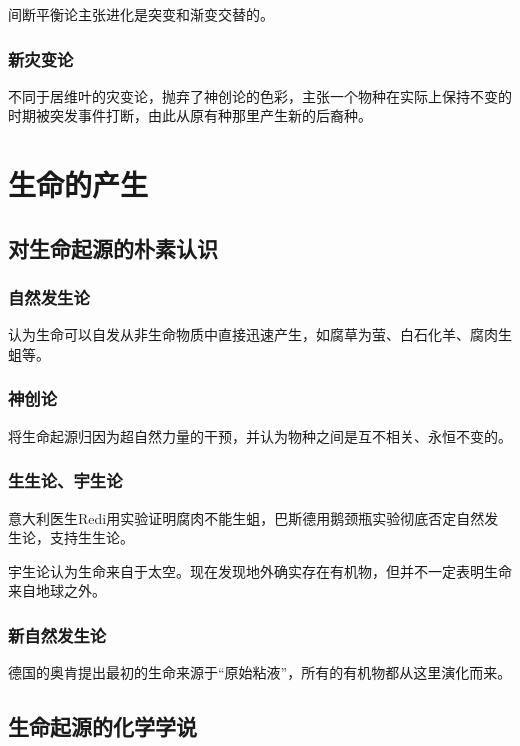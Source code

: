 间断平衡论主张进化是突变和渐变交替的。

\subsubsection{新灾变论}

不同于居维叶的灾变论，抛弃了神创论的色彩，主张一个物种在实际上保持不变的时期被突发事件打断，由此从原有种那里产生新的后裔种。

\section{生命的产生}

\subsection{对生命起源的朴素认识}

\subsubsection{自然发生论}

认为生命可以自发从非生命物质中直接迅速产生，如腐草为萤、白石化羊、腐肉生蛆等。

\subsubsection{神创论}

将生命起源归因为超自然力量的干预，并认为物种之间是互不相关、永恒不变的。

\subsubsection{生生论、宇生论}

意大利医生Redi用实验证明腐肉不能生蛆，巴斯德用鹅颈瓶实验彻底否定自然发生论，支持生生论。

宇生论认为生命来自于太空。现在发现地外确实存在有机物，但并不一定表明生命来自地球之外。

\subsubsection{新自然发生论}

德国的奥肯提出最初的生命来源于“原始粘液”，所有的有机物都从这里演化而来。

\subsection{生命起源的化学学说}

